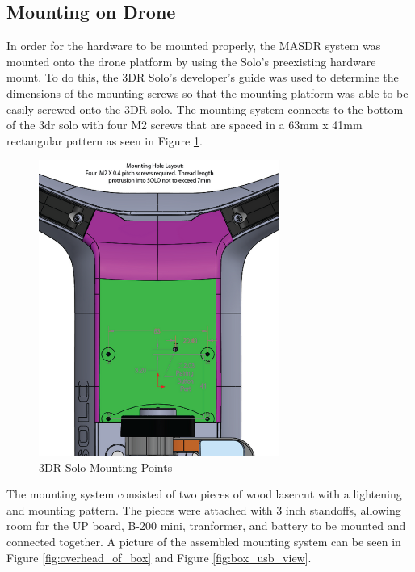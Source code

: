 {\subsection{Mounting on Drone} \label{Mounting}
In order for the hardware to be mounted properly, the MASDR system was mounted onto the drone platform by using the Solo’s preexisting hardware mount. To do this, the 3DR Solo’s developer's guide was used to determine the dimensions of the mounting screws so that the mounting platform was able to be easily screwed onto the 3DR solo. The mounting system connects to the bottom of the 3dr solo with four M2 screws that are spaced in a 63mm x 41mm rectangular pattern as seen in Figure \ref{fig:solo_mount}.
\begin{figure}[ht]
\centering
\includegraphics[width=0.70\textwidth]{img/solo_mount_points.png}
\caption{3DR Solo Mounting Points}
\label{fig:solo_mount}
\end{figure} \par
The mounting system consisted of two pieces of wood lasercut with a lightening and mounting pattern. The pieces were attached with 3 inch standoffs, allowing room for the UP board, B-200 mini, tranformer, and battery to be mounted and connected together. A picture of the assembled mounting system can be seen in Figure \ref{fig:overhead_of_box} and Figure \ref{fig:box_usb_view}.

}
